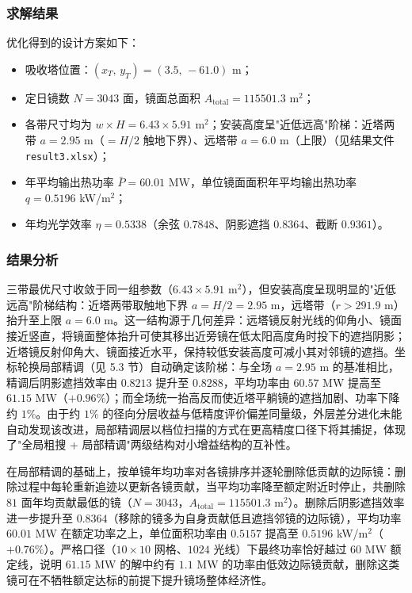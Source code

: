 \documentclass[12pt,a4paper,fontset=fandol]{ctexart}
\begin{document}
\subsubsection{求解结果}

优化得到的设计方案如下：
\begin{itemize}
    \item 吸收塔位置：$(x_T,\,y_T) = (3.5,\,-61.0)$ m；
    \item 定日镜数 $N = 3043$ 面，镜面总面积 $A_{\mathrm{total}} = 115501.3$ m$^{2}$；
    \item 各带尺寸均为 $w \times H = 6.43 \times 5.91$ m$^{2}$；安装高度呈"近低远高"阶梯：近塔两带 $a = 2.95$ m（$= H/2$ 触地下界）、远塔带 $a = 6.0$ m（上限）（见结果文件 \texttt{result3.xlsx}）；
    \item 年平均输出热功率 $\bar P = 60.01$ MW，单位镜面面积年平均输出热功率 $q = 0.5196$ kW/m$^{2}$；
    \item 年均光学效率 $\eta = 0.5338$（余弦 $0.7848$、阴影遮挡 $0.8364$、截断 $0.9361$）。
\end{itemize}

\subsubsection{结果分析}

三带最优尺寸收敛于同一组参数（$6.43 \times 5.91$ m$^{2}$），但安装高度呈现明显的"近低远高"阶梯结构：近塔两带取触地下界 $a = H/2 = 2.95$ m，远塔带（$r > 291.9$ m）抬升至上限 $a = 6.0$ m。这一结构源于几何差异：远塔镜反射光线的仰角小、镜面接近竖直，将镜面整体抬升可使其移出近旁镜在低太阳高度角时投下的遮挡阴影；近塔镜反射仰角大、镜面接近水平，保持较低安装高度可减小其对邻镜的遮挡。坐标轮换局部精调（见 5.3 节）自动确定该阶梯：与全场 $a = 2.95$ m 的基准相比，精调后阴影遮挡效率由 $0.8213$ 提升至 $0.8288$，平均功率由 $60.57$ MW 提高至 $61.15$ MW（$+0.96\%$）；而全场统一抬高反而使近塔平躺镜的遮挡加剧、功率下降约 $1\%$。由于约 $1\%$ 的径向分层收益与低精度评价偏差同量级，外层差分进化未能自动发现该改进，局部精调层以档位扫描的方式在更高精度口径下将其捕捉，体现了"全局粗搜 + 局部精调"两级结构对小增益结构的互补性。

在局部精调的基础上，按单镜年均功率对各镜排序并逐轮删除低贡献的边际镜：删除过程中每轮重新追迹以更新各镜贡献，当平均功率降至额定附近时停止，共删除 $81$ 面年均贡献最低的镜（$N = 3043$，$A_{\mathrm{total}} = 115501.3$ m$^{2}$）。删除后阴影遮挡效率进一步提升至 $0.8364$（移除的镜多为自身贡献低且遮挡邻镜的边际镜），平均功率 $60.01$ MW 在额定功率之上，单位面积功率由 $0.5157$ 提高至 $0.5196$ kW/m$^{2}$（$+0.76\%$）。严格口径（$10\times10$ 网格、$1024$ 光线）下最终功率恰好越过 $60$ MW 额定线，说明 $61.15$ MW 的解中约有 $1.1$ MW 的功率由低效边际镜贡献，删除这类镜可在不牺牲额定达标的前提下提升镜场整体经济性。
\end{document}
